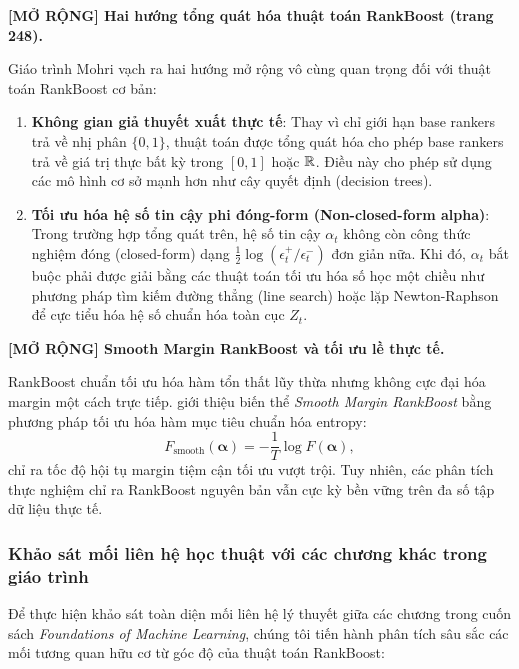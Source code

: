 \begin{morong}
\textbf{[MỞ RỘNG] Hai hướng tổng quát hóa thuật toán RankBoost (trang 248).}

Giáo trình Mohri vạch ra hai hướng mở rộng vô cùng quan trọng đối với thuật toán RankBoost cơ bản:
\begin{enumerate}
    \item \textbf{Không gian giả thuyết xuất thực tế}: Thay vì chỉ giới hạn base rankers trả về nhị phân $\{0,1\}$, thuật toán được tổng quát hóa cho phép base rankers trả về giá trị thực bất kỳ trong $[0,1]$ hoặc $\mathbb{R}$. Điều này cho phép sử dụng các mô hình cơ sở mạnh hơn như cây quyết định (decision trees).
    \item \textbf{Tối ưu hóa hệ số tin cậy phi đóng-form (Non-closed-form alpha)}: Trong trường hợp tổng quát trên, hệ số tin cậy $\alpha_t$ không còn công thức nghiệm đóng (closed-form) dạng $\frac{1}{2}\log(\epsilon^+_t/\epsilon^-_t)$ đơn giản nữa. Khi đó, $\alpha_t$ bắt buộc phải được giải bằng các thuật toán tối ưu hóa số học một chiều như phương pháp tìm kiếm đường thẳng (line search) hoặc lặp Newton-Raphson để cực tiểu hóa hệ số chuẩn hóa toàn cục $Z_t$.
\end{enumerate}
\end{morong}

\begin{morong}
\textbf{[MỞ RỘNG] Smooth Margin RankBoost và tối ưu lề thực tế.}

RankBoost chuẩn tối ưu hóa hàm tổn thất lũy thừa nhưng không cực đại hóa margin một cách trực tiếp. \citet{rudin2005margin} giới thiệu biến thể \textit{Smooth Margin RankBoost} bằng phương pháp tối ưu hóa hàm mục tiêu chuẩn hóa entropy:
\[
    F_{\text{smooth}}(\bm{\alpha}) = -\frac{1}{T}\log F(\bm{\alpha}),
\]
chỉ ra tốc độ hội tụ margin tiệm cận tối ưu vượt trội. Tuy nhiên, các phân tích thực nghiệm chỉ ra RankBoost nguyên bản vẫn cực kỳ bền vững trên đa số tập dữ liệu thực tế.
\end{morong}

\subsubsection{Khảo sát mối liên hệ học thuật với các chương khác trong giáo trình}
\label{sec:rankboost_connections}

Để thực hiện khảo sát toàn diện mối liên hệ lý thuyết giữa các chương trong cuốn sách \textit{Foundations of Machine Learning}, chúng tôi tiến hành phân tích sâu sắc các mối tương quan hữu cơ từ góc độ của thuật toán RankBoost:

